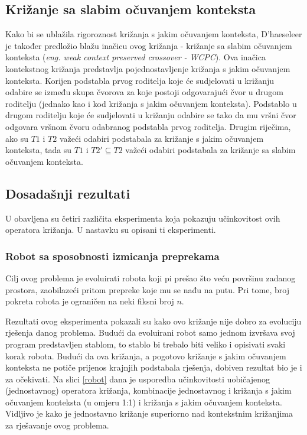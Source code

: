 \subsection{Križanje sa slabim očuvanjem konteksta}
Kako bi se ublažila rigoroznost križanja s jakim očuvanjem konteksta, D'haeseleer \cite{crxContext} je također predložio blažu inačicu ovog križanja - križanje sa slabim očuvanjem konteksta (\textit{eng. weak context preserved crossover - WCPC}). Ova inačica kontekstnog križanja predstavlja pojednostavljenje križanja s jakim očuvanjem konteksta. Korijen podstabla prvog roditelja koje će sudjelovati u križanju odabire se između skupa čvorova za koje postoji odgovarajući čvor u drugom roditelju (jednako kao i kod križanja s jakim očuvanjem konteksta). Podstablo u drugom roditelju koje će sudjelovati u križanju odabire se tako da mu vršni čvor odgovara vršnom čvoru odabranog podstabla prvog roditelja. Drugim riječima, ako su $T1$ i $T2$ važeći odabiri podstabala za križanje s jakim očuvanjem konteksta, tada su $T1$ i $T2' \subseteq T2$ važeći odabiri podstabala za križanje sa slabim očuvanjem konteksta.

\subsection{Dosadašnji rezultati}
U \cite{crxContext} obavljena su četiri različita eksperimenta koja pokazuju učinkovitost ovih operatora križanja. U nastavku su opisani ti eksperimenti.

\subsubsection{Robot sa sposobnosti izmicanja preprekama}
Cilj ovog problema je evoluirati robota koji pi prešao što veću površinu zadanog prostora, zaobilazeći pritom prepreke koje mu se nađu na putu. Pri tome, broj pokreta robota je ograničen na neki fiksni broj $n$. 

Rezultati ovog eksperimenta pokazali su kako ovo križanje nije dobro za evoluciju rješenja danog problema. Budući da evoluirani robot samo jednom izvršava svoj program predstavljen stablom, to stablo bi trebalo biti veliko i opisivati svaki korak robota. Budući da ova križanja, a pogotovo križanje s jakim očuvanjem konteksta ne potiče prijenos krajnjih podstabala rješenja, dobiven rezultat bio je i za očekivati. Na slici \ref{robot} dana je usporedba učinkovitosti uobičajenog (jednostavnog) operatora križanja, kombinacije jednostavnog i križanja s jakim očuvanjem konteksta (u omjeru 1:1) i križanja s jakim očuvanjem konteksta. Vidljivo je kako je jednostavno križanje superiorno nad kontekstnim križanjima za rješavanje ovog problema.

